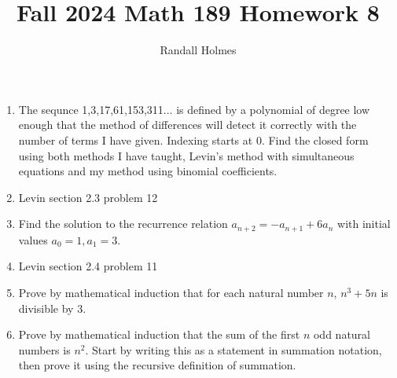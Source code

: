 \documentclass[12pt]{article}
\title{Fall 2024 Math 189 Homework 8}
\author{Randall Holmes}
\begin{document}
\maketitle

\begin{enumerate}

\item  The sequnce 1,3,17,61,153,311$\ldots$ is defined by a polynomial of degree low enough that the method of differences will detect it correctly with the number of terms I have given.  Indexing starts at 0.  Find the closed form using both methods I have taught, Levin's method with simultaneous equations and my method using binomial coefficients.


\item  Levin section 2.3 problem 12


\item  Find the solution to the recurrence relation $a_{n+2} = -a_{n+1}+6a_n$ with initial values $a_0=1, a_1 = 3$.
\item   Levin section 2.4 problem 11
\item  Prove by mathematical induction that for each natural number $n$, $n^3 + 5n$ is divisible by 3.

\item  Prove by mathematical induction that the sum of the first $n$ odd natural numbers is $n^2$.  Start by writing this as a statement in summation notation, then prove it using the recursive definition of summation.

\end{enumerate}
\end{document}
